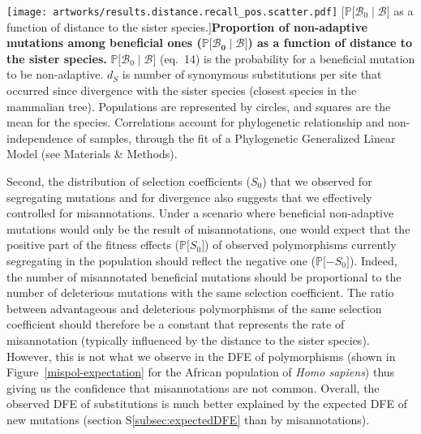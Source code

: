 \documentclass{article}
\newcommand{\proba}{\mathbb{P}}
\newcommand{\ds}{d_S}
\newcommand{\Sphy}{S_{0}}
\newcommand{\SphyBen}{\mathcal{B}_0}
\newcommand{\given}{\mid}
\newcommand{\SpopBen}{\mathcal{B}}
\begin{document}
    \begin{center}
        \texttt{[image: artworks/results.distance.recall\_pos.scatter.pdf]}
        [$\proba{[}\SphyBen\given \SpopBen {]}$ as a function of distance to the sister species.]{\textbf{Proportion of non-adaptive mutations among beneficial ones ($\bm{\proba{[}\SphyBen\given \SpopBen {]}}$) as a function of distance to the sister species.}
        $\proba{[} \SphyBen \given \SpopBen{]}$ (eq.~14) is the probability for a beneficial mutation to be non-adaptive.
        $\ds$ is number of synonymous substitutions per site that occurred since divergence with the sister species (closest species in the mammalian tree).
        Populations are represented by circles, and squares are the mean for the species.
        Correlations account for phylogenetic relationship and non-independence of samples, through the fit of a Phylogenetic Generalized Linear Model (see Materials \& Methods).\label{fig:distance-sister}}
    \end{center}

    \newpage

    Second, the distribution of selection coefficients ($\Sphy$) that we observed for segregating mutations and for divergence also suggests that we effectively controlled for misannotations.
    Under a scenario where beneficial non-adaptive mutations would only be the result of misannotations, one would expect that the positive part of the fitness effects ($\proba{[}\Sphy{]}$) of observed polymorphisms currently segregating in the population should reflect the negative one ($\proba{[}-\Sphy{]}$).
    Indeed, the number of misannotated beneficial mutations should be proportional to the number of deleterious mutations with the same selection coefficient.
    The ratio between advantageous and deleterious polymorphisms of the same selection coefficient should therefore be a constant that represents the rate of misannotation (typically influenced by the distance to the sister species).
    However, this is not what we observe in the DFE of polymorphisms (shown in Figure~\ref{mispol-expectation} for the African population of \textit{Homo sapiens}) thus giving us the confidence that misannotations are not common.
    Overall, the observed DFE of substitutions is much better explained by the expected DFE of new mutations (section S\ref{subsec:expectedDFE} than by misannotations).
\end{document}
